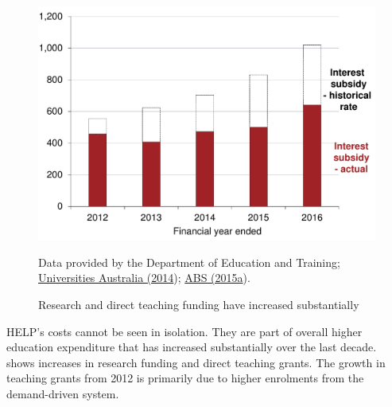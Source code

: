 \documentclass[embargoed]{grattan}
\begin{document}
\begin{figure}
\caption{Research and direct teaching funding have increased substantially\label{fig:fig12-research-direct-teaching-funding-have-increased-substantially}}


\includegraphics[page=12]{atlas/Chartpack.pdf}

{Data provided by the Department of Education and Training; \protect\hyperlink{_ENREF_78}{Universities Australia (2014}); \protect\hyperlink{_ENREF_2}{ABS (2015a}).}
\end{figure}


\gls{HELP}'s costs cannot be seen in isolation.
They are part of overall higher education expenditure that has increased substantially over the last decade.
 shows increases in research funding and direct teaching grants.
The growth in teaching grants from 2012 is primarily due to higher enrolments from the demand-driven system.
\end{document}
